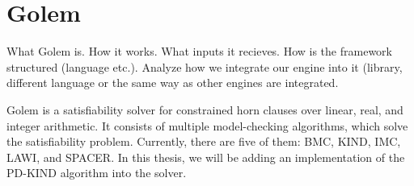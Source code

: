 \chapter{Golem}

What Golem is. 
How it works. 
What inputs it recieves.
How is the framework structured (language etc.). Analyze how we integrate our engine into it (library, different language or the same way as other engines are integrated.

Golem is a satisfiability solver for constrained horn clauses over linear, real, and integer arithmetic. It consists of multiple model-checking algorithms, which solve the satisfiability problem. Currently, there are five of them: BMC, KIND, IMC, LAWI, and SPACER. In this thesis, we will be adding an implementation of the PD-KIND algorithm into the solver.
